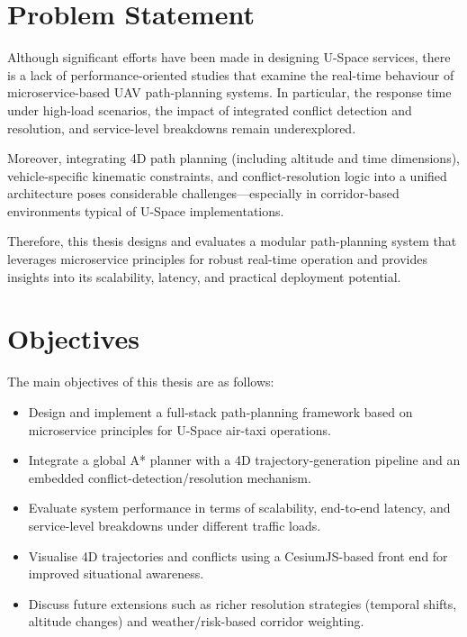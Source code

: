\section{Problem Statement}%
\label{s_contribution}

Although significant efforts have been made in designing U-Space services, there is a lack of performance-oriented studies that examine the real-time behaviour of microservice-based UAV path-planning systems.  
In particular, the response time under high-load scenarios, the impact of integrated conflict detection and resolution, and service-level breakdowns remain underexplored.

Moreover, integrating 4D path planning (including altitude and time dimensions), vehicle-specific kinematic constraints, and conflict-resolution logic into a unified architecture poses considerable challenges—especially in corridor-based environments typical of U-Space implementations.

Therefore, this thesis designs and evaluates a modular path-planning system that leverages microservice principles for robust real-time operation and provides insights into its scalability, latency, and practical deployment potential.

\section{Objectives}%
\label{s_objectives}

The main objectives of this thesis are as follows:

\begin{itemize}
  \item Design and implement a full-stack path-planning framework based on microservice principles for U-Space air-taxi operations.
  \item Integrate a global A* planner with a 4D trajectory-generation pipeline and an embedded conflict-detection/resolution mechanism.
  \item Evaluate system performance in terms of scalability, end-to-end latency, and service-level breakdowns under different traffic loads.
  \item Visualise 4D trajectories and conflicts using a CesiumJS-based front end for improved situational awareness.
  \item Discuss future extensions such as richer resolution strategies (temporal shifts, altitude changes) and weather/risk-based corridor weighting.
\end{itemize}

